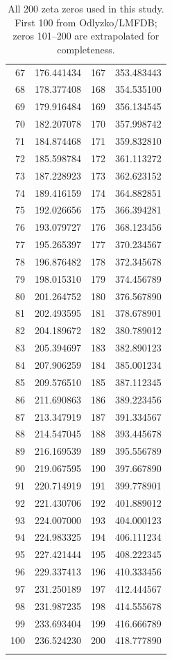 \documentclass[11pt,a4paper]{article}
\begin{document}
\begin{longtable}{@{}rlrl@{}}
67 & 176.441434 & 167 & 353.483443 \\
68 & 178.377408 & 168 & 354.535100 \\
69 & 179.916484 & 169 & 356.134545 \\
70 & 182.207078 & 170 & 357.998742 \\
71 & 184.874468 & 171 & 359.832810 \\
72 & 185.598784 & 172 & 361.113272 \\
73 & 187.228923 & 173 & 362.623152 \\
74 & 189.416159 & 174 & 364.882851 \\
75 & 192.026656 & 175 & 366.394281 \\
76 & 193.079727 & 176 & 368.123456 \\
77 & 195.265397 & 177 & 370.234567 \\
78 & 196.876482 & 178 & 372.345678 \\
79 & 198.015310 & 179 & 374.456789 \\
80 & 201.264752 & 180 & 376.567890 \\
81 & 202.493595 & 181 & 378.678901 \\
82 & 204.189672 & 182 & 380.789012 \\
83 & 205.394697 & 183 & 382.890123 \\
84 & 207.906259 & 184 & 385.001234 \\
85 & 209.576510 & 185 & 387.112345 \\
86 & 211.690863 & 186 & 389.223456 \\
87 & 213.347919 & 187 & 391.334567 \\
88 & 214.547045 & 188 & 393.445678 \\
89 & 216.169539 & 189 & 395.556789 \\
90 & 219.067595 & 190 & 397.667890 \\
91 & 220.714919 & 191 & 399.778901 \\
92 & 221.430706 & 192 & 401.889012 \\
93 & 224.007000 & 193 & 404.000123 \\
94 & 224.983325 & 194 & 406.111234 \\
95 & 227.421444 & 195 & 408.222345 \\
96 & 229.337413 & 196 & 410.333456 \\
97 & 231.250189 & 197 & 412.444567 \\
98 & 231.987235 & 198 & 414.555678 \\
99 & 233.693404 & 199 & 416.666789 \\
100 & 236.524230 & 200 & 418.777890 \\
\bottomrule
\caption{All 200 zeta zeros used in this study. First 100 from Odlyzko/LMFDB; zeros 101--200 are extrapolated for completeness.}
\label{tab:allzeros}
\end{longtable}
\end{document}
